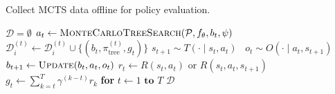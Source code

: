 \begin{algorithm}[H]
    \small
    \caption{Collect MCTS data offline for policy evaluation.} 
    \label{alg:collect_data}
    \begin{algorithmic}[1]
        \State $\mathcal{D} = \emptyset$
          \label{line:parallel}
                \State $a_t \leftarrow \textproc{MonteCarloTreeSearch}(\mathcal{P}, f_\theta, b_t, \psi)$ 
                \State $\mathcal{D}_i^{(t)} \leftarrow \mathcal{D}_i^{(t)} \cup \big\{(b_t, \pi_\text{tree}^{(t)}, g_t) \big\}$ 
                \State $s_{t+1} \sim T(\cdot \mid s_t, a_t)\phantom{\big\}}$ %
                \State $o_t \sim O(\cdot \mid a_t, s_{t+1})$
                \State $b_{t+1} \leftarrow \textproc{Update}(b_t, a_t, o_t)$
                \hspace*{3em}%
                \State $r_t \leftarrow R(s_t, a_t)$ or $R(s_t, a_t, s_{t+1})$
            \EndFor
            \State $g_t \leftarrow \sum_{k=t}^T \gamma^{(k-t)} r_k$ \textbf{ for } $t \leftarrow 1 \textbf{ to } T$ 
        \EndParallelFor
        \State \Return $\mathcal{D}$
    \EndFunction
    \end{algorithmic}
\end{algorithm}
